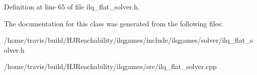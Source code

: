 Definition at line 65 of file ilq\+\_\+flat\+\_\+solver.\+h.



The documentation for this class was generated from the following files\+:\begin{DoxyCompactItemize}
\item 
/home/travis/build/\+H\+J\+Reachability/ilqgames/include/ilqgames/solver/ilq\+\_\+flat\+\_\+solver.\+h\item 
/home/travis/build/\+H\+J\+Reachability/ilqgames/src/ilq\+\_\+flat\+\_\+solver.\+cpp\end{DoxyCompactItemize}
